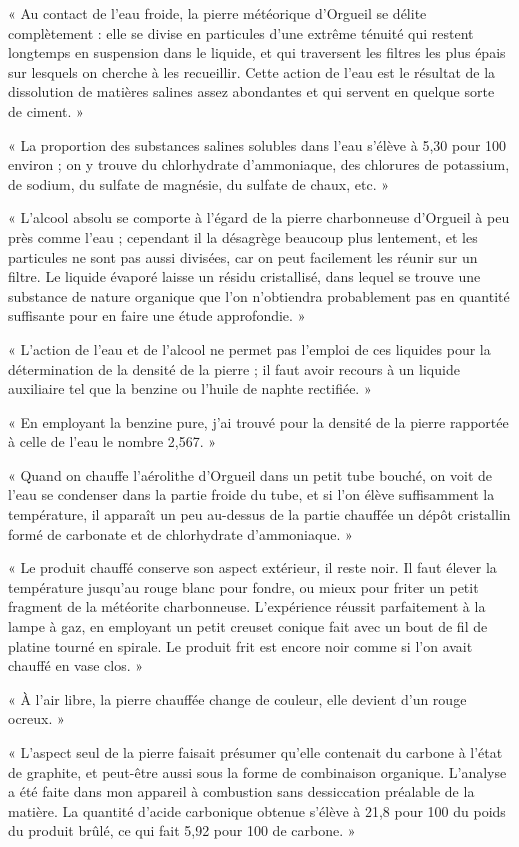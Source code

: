 \documentclass[a4paper, 11pt, oneside, polutonikogreek, french]{article}
\begin{document}
« Au contact de l'eau froide, la pierre météorique d'Orgueil se délite complètement : elle se divise en particules d'une extrême ténuité qui restent longtemps en suspension dans le liquide, et qui traversent les filtres les plus épais sur lesquels on cherche à les recueillir. Cette action de l'eau est le résultat de la dissolution de matières salines assez abondantes et qui servent en quelque sorte de ciment. »

« La proportion des substances salines solubles dans l'eau s'élève à 5,30 pour 100 environ ; on y trouve du chlorhydrate d'ammoniaque, des chlorures de potassium, de sodium, du sulfate de magnésie, du sulfate de chaux, etc. »

« L'alcool absolu se comporte à l'égard de la pierre charbonneuse d'Orgueil à peu près comme l'eau ; cependant il la désagrège beaucoup plus lentement, et les particules ne sont pas aussi divisées, car on peut facilement les réunir sur un filtre. Le liquide évaporé laisse un résidu cristallisé, dans lequel se trouve une substance de nature organique que l'on n'obtiendra probablement pas en quantité suffisante pour en faire une étude approfondie. »

« L'action de l'eau et de l'alcool ne permet pas l'emploi de ces liquides pour la détermination de la densité de la pierre ; il faut avoir recours à un liquide auxiliaire tel que la benzine ou l'huile de naphte rectifiée. »

« En employant la benzine pure, j'ai trouvé pour la densité de la pierre rapportée à celle de l'eau le nombre 2,567. »

« Quand on chauffe l'aérolithe d'Orgueil dans un petit tube bouché, on voit de l'eau se condenser dans la partie froide du tube, et si l'on élève suffisamment la température, il apparaît un peu au-dessus de la partie chauffée un dépôt cristallin formé de carbonate et de chlorhydrate d'ammoniaque. »

« Le produit chauffé conserve son aspect extérieur, il reste noir. Il faut élever la température jusqu'au rouge blanc pour fondre, ou mieux pour friter un petit fragment de la météorite charbonneuse. L'expérience réussit parfaitement à la lampe à gaz, en employant un petit creuset conique fait avec un bout de fil de platine tourné en spirale. Le produit frit est encore noir comme si l'on avait chauffé en vase clos. »

« À l'air libre, la pierre chauffée change de couleur, elle devient d'un rouge ocreux. »

« L'aspect seul de la pierre faisait présumer qu'elle contenait du carbone à l'état de graphite, et peut-être aussi sous la forme de combinaison organique. L'analyse a été faite dans mon appareil à combustion sans dessiccation préalable de la matière. La quantité d'acide carbonique obtenue s'élève à 21,8 pour 100 du poids du produit brûlé, ce qui fait 5,92 pour 100 de carbone. »
\end{document}
